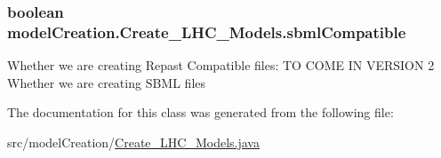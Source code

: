 \subsubsection[{sbml\+Compatible}]{\setlength{\rightskip}{0pt plus 5cm}boolean model\+Creation.\+Create\+\_\+\+L\+H\+C\+\_\+\+Models.\+sbml\+Compatible}\label{classmodelCreation_1_1Create__LHC__Models_a0d474e7cfe2b5a5c6a7210898f779447}
Whether we are creating Repast Compatible files\+: T\+O C\+O\+M\+E I\+N V\+E\+R\+S\+I\+O\+N 2 Whether we are creating S\+B\+M\+L files 

The documentation for this class was generated from the following file\+:\begin{DoxyCompactItemize}
\item 
src/model\+Creation/\hyperlink{Create__LHC__Models_8java}{Create\+\_\+\+L\+H\+C\+\_\+\+Models.\+java}\end{DoxyCompactItemize}
